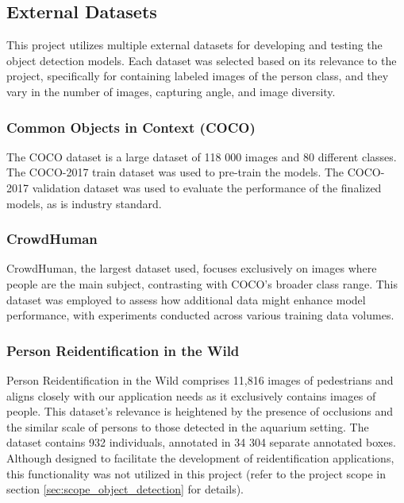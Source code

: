 \subsection{External Datasets}
This project utilizes multiple external datasets for developing and testing the object detection models. Each dataset was selected based on its relevance to the project, specifically for containing labeled images of the person class, and they vary in the number of images, capturing angle, and image diversity.

\subsubsection{Common Objects in Context (COCO)}
\label{sec:dataset_COCO}
The COCO dataset is a large dataset of 118 000 images and 80 different classes. The COCO-2017 train dataset was used to pre-train the models. The COCO-2017 validation dataset was used to evaluate the performance of the finalized models, as is industry standard. 

\subsubsection{CrowdHuman}
\label{sec:dataset_CrowdHuman}
CrowdHuman, the largest dataset used, focuses exclusively on images where people are the main subject, contrasting with COCO’s broader class range. This dataset was employed to assess how additional data might enhance model performance, with experiments conducted across various training data volumes.

\subsubsection{Person Reidentification in the Wild}
\label{sec:dataset_PRW}
Person Reidentification in the Wild comprises 11,816 images of pedestrians and aligns closely with our application needs as it exclusively contains images of people. This dataset's relevance is heightened by the presence of occlusions and the similar scale of persons to those detected in the aquarium setting. The dataset contains 932 individuals, annotated in 34 304 separate annotated boxes. Although designed to facilitate the development of reidentification applications, this functionality was not utilized in this project (refer to the project scope in section \ref{sec:scope_object_detection} for details). 



